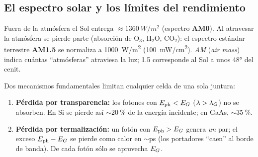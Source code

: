 \subsection{El espectro solar y los límites del rendimiento}

Fuera de la atmósfera el Sol entrega $\approx\SI{1360}{W/m^2}$ (espectro \textbf{AM0}). Al
atravesar la atmósfera se pierde parte (absorción de O$_3$, H$_2$O, CO$_2$): el espectro
estándar terrestre \textbf{AM1.5} se normaliza a \SI{1000}{W/m^2} (\SI{100}{mW/cm^2}).
\emph{AM} (\emph{air mass}) indica cuántas ``atmósferas'' atraviesa la luz; 1.5 corresponde
al Sol a unos \ang{48} del cenit.

Dos mecanismos fundamentales limitan cualquier celda de una sola juntura:
\begin{enumerate}
  \item \textbf{Pérdida por transparencia:} los fotones con $E_{\mathrm{ph}}<E_G$ ($\lambda>\lambda_G$) no se
  absorben. En Si se pierde así $\sim\SI{20}{\percent}$ de la energía incidente; en GaAs,
  $\sim\SI{35}{\percent}$.
  \item \textbf{Pérdida por termalización:} un fotón con $E_{\mathrm{ph}}>E_G$ genera \emph{un} par; el
  exceso $E_{\mathrm{ph}}-E_G$ se pierde como calor en $\sim$\si{ps} (los portadores ``caen'' al
  borde de banda). De cada fotón sólo se aprovecha $E_G$.
\end{enumerate}

